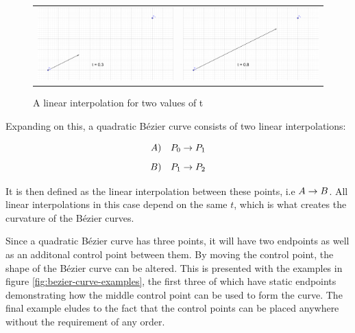     \begin{figure}[ht]
        \begin{tabular}{cc}
            \includegraphics[width=0.48\linewidth]{figures/theory/bezier_curves/linear_interpolation1.png} & 
            \includegraphics[width=0.48\linewidth]{figures/theory/bezier_curves/linear_interpolation2.png} \\
        \end{tabular}
        \caption{A linear interpolation for two values of t}
        \label{fig:linear-interpolation}
    \end{figure}
    
    Expanding on this, a quadratic Bézier curve consists of two linear interpolations:
    
    $$ A) \quad P_0 \rightarrow P_1 $$
    $$ B) \quad P_1 \rightarrow P_2 $$
    
    It is then defined as the linear interpolation between these points, i.e $ A \rightarrow B $. All linear interpolations in this case depend on the same $t$, which is what creates the curvature of the Bézier curves.

    Since a quadratic Bézier curve has three points, it will have two endpoints as well as an additonal control point between them. By moving the control point, the shape of the Bézier curve can be altered. This is presented with the examples in figure \ref{fig:bezier-curve-examples}, the first three of which have static endpoints demonstrating how the middle control point can be used to form the curve. The final example eludes to the fact that the control points can be placed anywhere without the requirement of any order.

